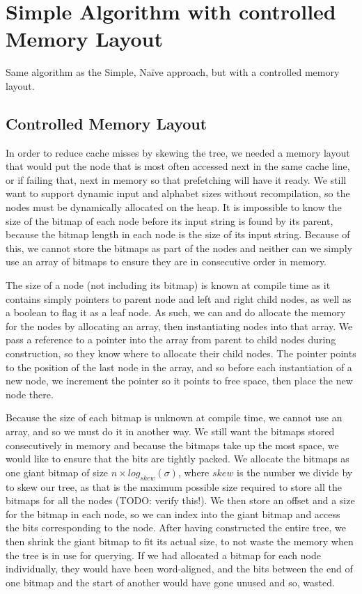 \section{Simple Algorithm with controlled Memory Layout}
Same algorithm as the Simple, Naïve approach, but with a controlled memory layout.

\subsection{Controlled Memory Layout}
In order to reduce cache misses by skewing the tree, we needed a memory layout that would put the node that is most often accessed next in the same cache line, or if failing that, next in memory so that prefetching will have it ready.
We still want to support dynamic input and alphabet sizes without recompilation, so the nodes must be dynamically allocated on the heap.
It is impossible to know the size of the bitmap of each node before its input string is found by its parent, because the bitmap length in each node is the size of its input string.
Because of this, we cannot store the bitmaps as part of the nodes and neither can we simply use an array of bitmaps to ensure they are in consecutive order in memory.

The size of a node (not including its bitmap) is known at compile time as it contains simply pointers to parent node and left and right child nodes, as well as a boolean to flag it as a leaf node.
As such, we can and do allocate the memory for the nodes by allocating an array, then instantiating nodes into that array.
We pass a reference to a pointer into the array from parent to child nodes during construction, so they know where to allocate their child nodes.
The pointer points to the position of the last node in the array, and so before each instantiation of a new node, we increment the pointer so it points to free space, then place the new node there.

Because the size of each bitmap is unknown at compile time, we cannot use an array, and so we must do it in another way. We still want the bitmaps stored consecutively in memory and because the bitmaps take up the most space, we would like to ensure that the bits are tightly packed.
We allocate the bitmaps as one giant bitmap of size $n \times log_{skew}(\sigma)$, where $skew$ is the number we divide by to skew our tree, as that is the maximum possible size required to store all the bitmaps for all the nodes (TODO: verify this!). We then store an offset and a size for the bitmap in each node, so we can index into the giant bitmap and access the bits corresponding to the node.
After having constructed the entire tree, we then shrink the giant bitmap to fit its actual size, to not waste the memory when the tree is in use for querying.
If we had allocated a bitmap for each node individually, they would have been word-aligned, and the bits between the end of one bitmap and the start of another would have gone unused and so, wasted.

